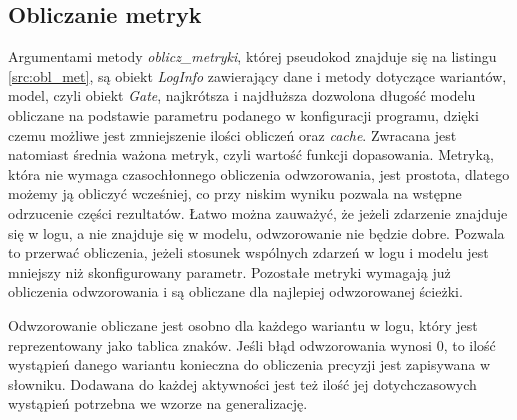 \subsection{Obliczanie metryk}
Argumentami metody \textit{oblicz{\_}metryki}, której pseudokod znajduje się na listingu \ref{src:obl_met}, są obiekt \textit{LogInfo} zawierający dane i metody dotyczące wariantów, model, czyli obiekt \textit{Gate}, najkrótsza i najdłuższa dozwolona długość modelu obliczane na podstawie parametru podanego w konfiguracji programu, dzięki czemu możliwe jest zmniejszenie ilości obliczeń oraz \textit{cache}. Zwracana jest natomiast średnia ważona metryk, czyli wartość funkcji dopasowania. Metryką, która nie wymaga czasochłonnego obliczenia odwzorowania, jest prostota, dlatego możemy ją obliczyć wcześniej, co przy niskim wyniku pozwala na wstępne odrzucenie części rezultatów. Łatwo można zauważyć, że jeżeli zdarzenie znajduje się w logu, a nie znajduje się w modelu, odwzorowanie nie będzie dobre. Pozwala to przerwać obliczenia, jeżeli stosunek wspólnych zdarzeń w logu i modelu jest mniejszy niż skonfigurowany parametr. Pozostałe metryki wymagają już obliczenia odwzorowania i są obliczane dla najlepiej odwzorowanej ścieżki. 

Odwzorowanie obliczane jest osobno dla każdego wariantu w logu, który jest reprezentowany jako tablica znaków. Jeśli błąd odwzorowania wynosi 0, to ilość wystąpień danego wariantu konieczna do obliczenia precyzji jest zapisywana w słowniku. Dodawana do każdej aktywności jest też ilość jej dotychczasowych wystąpień potrzebna we wzorze na generalizację.

